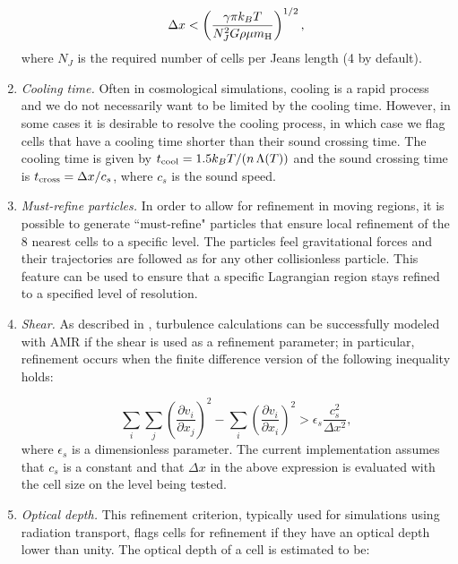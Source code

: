 \begin{enumerate}
\begin{equation}
\Delta x < \left( \frac{\gamma \pi k_B T}{N_J^2 G \rho \mu \mh} \right)^{1/2},
\end{equation}
where $N_J$ is the required number of cells per Jeans length (4 by default).

\item{\em Cooling time.}  Often in cosmological simulations, cooling
  is a rapid process and we do not necessarily want to be limited by
  the cooling time.  However, in some cases it is desirable to resolve
  the cooling process, in which case we flag cells that have a cooling
  time shorter than their sound crossing time.  The cooling time is
  given by $t_{\rm cool} = 1.5 k_BT / (n\, \Lambda(T))$ and the sound
  crossing time is $t_{\rm cross} = \Delta x / c_s$, where $c_s$ is
  the sound speed.


\item{\em Must-refine particles.}  In order to allow for refinement in
  moving regions, it is possible to generate ``must-refine" particles
  that ensure local refinement of the 8 nearest cells to a specific
  level.  The particles feel gravitational forces and their
  trajectories are followed as for any other collisionless particle.
  This feature can be used to ensure that a specific Lagrangian region
  stays refined to a specified level of resolution. 


\item{\em Shear.} As described in \citet{Kritsuk06}, turbulence
  calculations can be successfully modeled with AMR if the shear is
  used as a refinement parameter; in particular, refinement occurs
  when the finite difference version of the following inequality
  holds:

\begin{equation}
\sum_i \sum_j \left( \frac{\partial v_i}{\partial x_j} \right)^2 -  \sum_i \left( \frac{\partial v_i}{\partial x_i} \right)^2
> \epsilon_s \frac{c_s^2}{\Delta x^2},
\end{equation}
where $\epsilon_s$ is a dimensionless parameter. The current
implementation assumes that $c_s$ is a constant and that $\Delta x$ in
the above expression is evaluated with the cell size on the level
being tested.

\item{\em Optical depth.} This refinement criterion, typically used
for simulations using radiation transport, flags cells for refinement
if they have an  optical depth lower than unity.  The
optical depth of a cell is estimated to be:


\end{enumerate}
